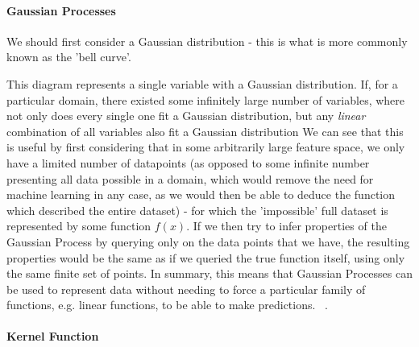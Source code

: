 \documentclass[10pt]{article}
\newcommand\gauss[2]{1/(#2*sqrt(2*pi))*exp(-((x-#1)^2)/(2*#2^2))}
\begin{document}
\begin{multicols}{2}
    \paragraph{Gaussian Processes}

    We should first consider a Gaussian distribution - this is what is more commonly known as the 'bell curve'. 


    This diagram represents a single variable with a Gaussian distribution. If, for a particular domain, there existed some infinitely large number of variables, where not only does every single one fit a Gaussian distribution, but any \textit{linear} combination of all variables also fit a Gaussian distribution We can see that this is useful by first considering that in some arbitrarily large feature space, we only have a limited number of datapoints (as opposed to some infinite number presenting all data possible in a domain, which would remove the need for machine learning in any case, as we would then be able to deduce the function which described the entire dataset) - for which the 'impossible' full dataset is represented by some function $f(x)$. If we then try to infer properties of the Gaussian Process by querying only on the data points that we have, the resulting properties would be the same as if we queried the true function itself, using only the same finite set of points. In summary, this means that Gaussian Processes can be used to represent data without needing to force a particular family of functions, e.g. linear functions, to be able to make predictions. ~\citep{rasmussen06}.

    \paragraph{Kernel Function}


\end{multicols}
\end{document}
